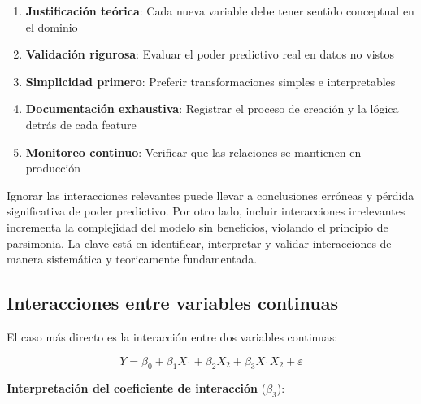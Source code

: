 \documentclass[
  letterpaper,
  DIV=11,
  numbers=noendperiod]{scrreprt}
\providecommand{\tightlist}{%
  \setlength{\itemsep}{0pt}\setlength{\parskip}{0pt}}
\begin{document}
\begin{tcolorbox}[enhanced jigsaw, breakable, toprule=.15mm, bottomtitle=1mm, coltitle=black, colbacktitle=quarto-callout-important-color!10!white, titlerule=0mm, opacitybacktitle=0.6, bottomrule=.15mm, toptitle=1mm, title=\textcolor{quarto-callout-important-color}{\faExclamation}\hspace{0.5em}{Principios para feature engineering efectivo}, arc=.35mm, rightrule=.15mm, opacityback=0, colframe=quarto-callout-important-color-frame, leftrule=.75mm, left=2mm, colback=white]

\begin{enumerate}
\def\labelenumi{\arabic{enumi}.}
\tightlist
\item
  \textbf{Justificación teórica}: Cada nueva variable debe tener sentido
  conceptual en el dominio
\item
  \textbf{Validación rigurosa}: Evaluar el poder predictivo real en
  datos no vistos
\item
  \textbf{Simplicidad primero}: Preferir transformaciones simples e
  interpretables
\item
  \textbf{Documentación exhaustiva}: Registrar el proceso de creación y
  la lógica detrás de cada feature
\item
  \textbf{Monitoreo continuo}: Verificar que las relaciones se mantienen
  en producción
\end{enumerate}

\end{tcolorbox}

Ignorar las interacciones relevantes puede llevar a conclusiones
erróneas y pérdida significativa de poder predictivo. Por otro lado,
incluir interacciones irrelevantes incrementa la complejidad del modelo
sin beneficios, violando el principio de parsimonia. La clave está en
identificar, interpretar y validar interacciones de manera sistemática y
teoricamente fundamentada.

\subsection{Interacciones entre variables
continuas}\label{interacciones-entre-variables-continuas}

El caso más directo es la interacción entre dos variables continuas:

\[Y = \beta_0 + \beta_1 X_1 + \beta_2 X_2 + \beta_3 X_1 X_2 + \varepsilon\]

\textbf{Interpretación del coeficiente de interacción} (\(\beta_3\)):
\end{document}
